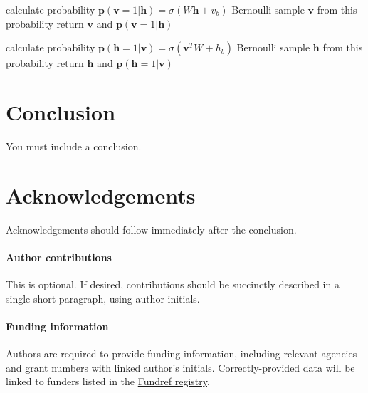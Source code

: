 \documentclass[submission, Phys]{SciPost}
\begin{document}



\begin{algorithm}[H]
	 \caption{calculate $\bm{p}(\bm{v}|\bm{h})$ and sample $\bm{v}$ \textbf{\lstinline{RBM.v_given_h}}() }
  \SetAlgoLined
  calculate probability $\bm{p}(\bm{v} = 1|\bm{h}) = \sigma( W \bm{h} + v_b)$\;
  Bernoulli sample $\bm{v}$ from this probability\;
  return $\bm{v}$ and $\bm{p}(\bm{v} = 1|\bm{h})$\;
 
\end{algorithm}


\begin{algorithm}[H]
	 \caption{calculate $\bm{p}(\bm{h}|\bm{v})$ and sample $\bm{h}$ \textbf{\lstinline{RBM.h_given_v}}() }
  \SetAlgoLined
  calculate probability $\bm{p}(\bm{h} = 1|\bm{v}) = \sigma(\bm{v}^T W  + h_b)$\;
  Bernoulli sample $\bm{h}$ from this probability\;
  return $\bm{h}$ and $\bm{p}(\bm{h} = 1|\bm{v})$\;
 
\end{algorithm}


\section{Conclusion}
You must include a conclusion.

\section*{Acknowledgements}
Acknowledgements should follow immediately after the conclusion.

\paragraph{Author contributions}
This is optional. If desired, contributions should be succinctly described in a single short paragraph, using author initials.

\paragraph{Funding information}
Authors are required to provide funding information, including relevant agencies and grant numbers with linked author's initials. Correctly-provided data will be linked to funders listed in the \href{https://www.crossref.org/services/funder-registry/}{\sf Fundref registry}.
\end{document}
